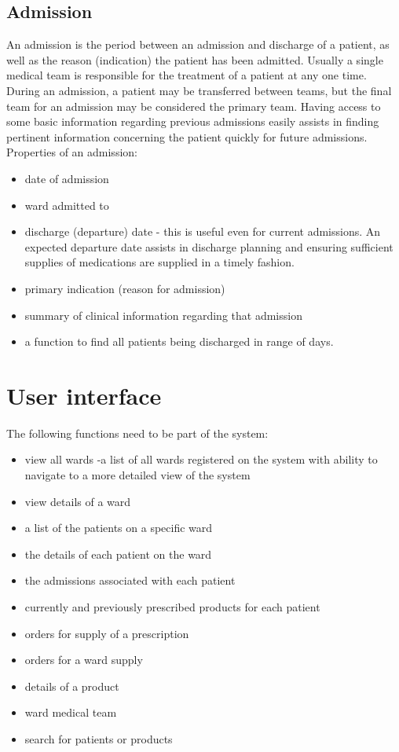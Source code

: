 \documentclass[letterpaper]{amsart}
\begin{document}
\subsection{Admission} An admission is the period between an admission and discharge of a patient, as well as the reason (indication) the patient has been admitted.  Usually a single medical team is responsible for the treatment of a patient at any one time.  During an admission, a patient may be transferred between teams, but the final team for an admission may be considered the primary team.  Having access to some basic information regarding previous admissions easily assists in finding pertinent information concerning the patient quickly for future admissions.   
Properties of an admission:\\
\begin{itemize}
    \item date of admission 
    \item ward admitted to 
    \item discharge (departure) date - this is useful even for current admissions.  An expected departure date assists in discharge planning and ensuring sufficient supplies of medications are supplied in a timely fashion. 
    \item primary indication (reason for admission) 
    \item summary of clinical information regarding that admission 
    \item a function to find all patients being discharged in range of days.
\end{itemize}


\section{User interface}


The following functions need to be part of the system:
\begin{itemize}
    \item view all wards -a list of all wards registered on the system with ability to navigate to a more detailed view of the system
    \item view details of a  ward
    \item a list of the patients on a specific ward
    \item the details of each patient on the ward
    \item the admissions associated with each patient
    \item currently and previously prescribed products for each patient
    \item orders for supply of a prescription
    \item orders for a ward supply
    \item details of a product
    \item ward medical team 
    \item search for patients or products
\end{itemize}
\end{document}
